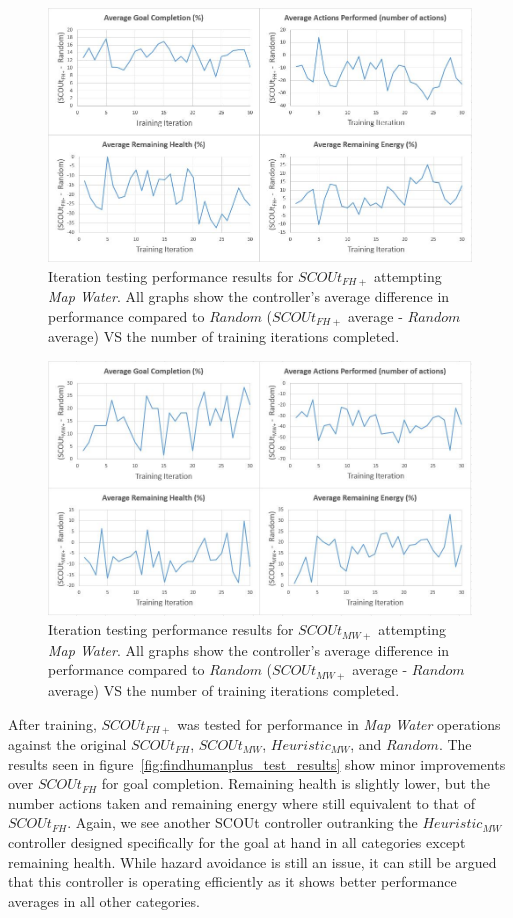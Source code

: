\begin{figure}[H]
  \includegraphics[width=0.9\columnwidth]{Figures/Results/Experiment2/AdditionalTraining/FHPlus_Training.JPG}
  \caption{Iteration testing performance results for $SCOUt_{FH+}$ attempting \textit{Map Water}. All graphs show the controller's average difference in performance compared to $Random$ ($SCOUt_{FH+}$ average - $Random$ average) VS the number of training iterations completed.}
  \label{fig:findhumanplus_training_results}
\end{figure}

\begin{figure}[H]
  \includegraphics[width=0.9\columnwidth]{Figures/Results/Experiment2/AdditionalTraining/MWPlus_Training.JPG}
  \caption{Iteration testing performance results for $SCOUt_{MW+}$ attempting \textit{Map Water}. All graphs show the controller's average difference in performance compared to $Random$ ($SCOUt_{MW+}$ average - $Random$ average) VS the number of training iterations completed.}
  \label{fig:mapwaterplus_training_results}
\end{figure}


After training, $SCOUt_{FH+}$ was tested for performance in \textit{Map Water} operations against the original $SCOUt_{FH}$, $SCOUt_{MW}$, $Heuristic_{MW}$, and $Random$.
The results seen in figure~\ref{fig:findhumanplus_test_results} show minor improvements over $SCOUt_{FH}$ for goal completion.
Remaining health is slightly lower, but the number actions taken and remaining energy where still equivalent to that of $SCOUt_{FH}$.
Again, we see another SCOUt controller outranking the $Heuristic_{MW}$ controller designed specifically for the goal at hand in all categories except remaining health.
While hazard avoidance is still an issue, it can still be argued that this controller is operating efficiently as it shows better performance averages in all other categories.

